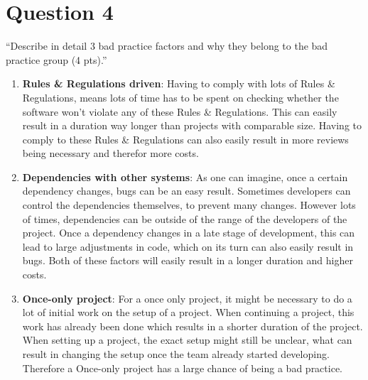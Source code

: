 \section{Question 4}

``Describe in detail 3 bad practice factors and why they belong to the bad practice group (4 pts).'' \\

\begin{enumerate}
	\item \textbf{Rules \& Regulations driven}: Having to comply with lots of Rules \& Regulations, means lots of time has to be spent on checking whether the software won't violate any of these Rules \& Regulations. This can easily result in a duration way longer than projects with comparable size. Having to comply to these Rules \& Regulations can also easily result in more reviews being necessary and therefor more costs. 
	\item \textbf{Dependencies with other systems}: As one can imagine, once a certain dependency changes, bugs can be an easy result. Sometimes developers can control the dependencies themselves, to prevent many changes. However lots of times, dependencies can be outside of the range of the developers of the project. Once a dependency changes in a late stage of development, this can lead to large adjustments in code, which on its turn can also easily result in bugs. Both of these factors will easily result in a longer duration and higher costs. 
	\item \textbf{Once-only project}: For a once only project, it might be necessary to do a lot of initial work on the setup of a project. When continuing a project, this work has already been done which results in a shorter duration of the project. When setting up a project, the exact setup might still be unclear, what can result in changing the setup once the team already started developing. Therefore a Once-only project has a large chance of being a bad practice. 
\end{enumerate}